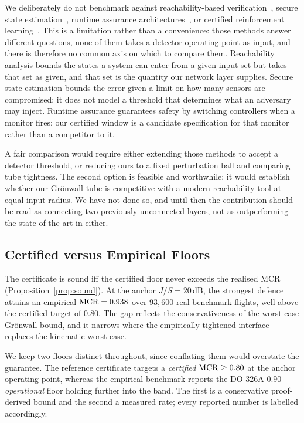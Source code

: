 We deliberately do not benchmark against reachability-based
verification~\cite{ivanov2019verisig,tran2020nnv}, secure state
estimation~\cite{fawzi2014secure,shoukry2017smt}, runtime assurance
architectures~\cite{sha2001simplex,mehmood2022blackbox,cofer2020rta}, or
certified reinforcement learning~\cite{wu2022crop,everett2021carrl}. This is a
limitation rather than a convenience: those methods answer different questions,
none of them takes a detector operating point as input, and there is therefore
no common axis on which to compare them. Reachability analysis bounds the states
a system can enter from a given input set but takes that set as given, and that
set is the quantity our network layer supplies. Secure state estimation
bounds the error given a limit on how many sensors are compromised; it does not model a
threshold that determines what an adversary may inject. Runtime assurance
guarantees safety by switching controllers when a monitor fires; our certified
window is a candidate specification for that monitor rather than a competitor
to it.

A fair comparison would require either extending those methods to accept a
detector threshold, or reducing ours to a fixed perturbation ball and comparing
tube tightness. The second option is feasible and worthwhile; it would establish
whether our Gr\"onwall tube is competitive with a modern reachability tool at
equal input radius. We have not done so, and until then the
contribution should be read as connecting two previously unconnected layers,
not as outperforming the state of the art in either.

\subsection{Certified versus Empirical Floors}
The certificate is sound iff the certified floor never exceeds the realised MCR
(Proposition~\ref{prop:sound}). At the anchor $J/S=20$\,dB, the strongest
defence attains an empirical $\mathrm{MCR}=0.938$ over $93{,}600$ real benchmark
flights, well above the certified target of $0.80$. The gap reflects the
conservativeness of the worst-case Gr\"onwall bound, and it narrows where the
empirically tightened interface replaces the kinematic worst case.

We keep two floors distinct throughout, since conflating them would overstate
the guarantee. The reference certificate targets a \emph{certified}
$\mathrm{MCR}\ge0.80$ at the anchor operating point, whereas the empirical benchmark
reports the DO-326A $0.90$ \emph{operational} floor holding further into the
band. The first is a conservative proof-derived bound and the second a
measured rate; every reported number is labelled accordingly.

